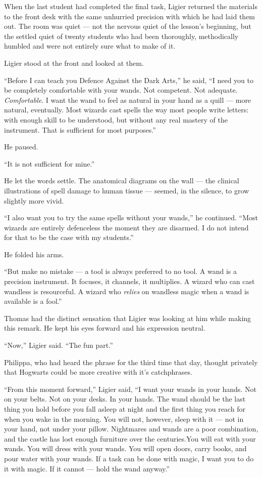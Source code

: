 When the last student had completed the final task, Ligier returned the materials to the front desk with the same unhurried precision with which he had laid them out. The room was quiet --- not the nervous quiet of the lesson's beginning, but the settled quiet of twenty students who had been thoroughly, methodically humbled and were not entirely sure what to make of it.
 
Ligier stood at the front and looked at them.
 
\enquote{Before I can teach you Defence Against the Dark Arts,} he said, \enquote{I need you to be completely comfortable with your wands. Not competent. Not adequate. \textit{Comfortable}. I want the wand to feel as natural in your hand as a quill --- more natural, eventually. Most wizards cast spells the way most people write letters: with enough skill to be understood, but without any real mastery of the instrument. That is sufficient for most purposes.}
 
He paused.
 
\enquote{It is not sufficient for mine.}
 
He let the words settle. The anatomical diagrams on the wall --- the clinical illustrations of spell damage to human tissue --- seemed, in the silence, to grow slightly more vivid.
 
\enquote{I also want you to try the same spells without your wands,} he continued. \enquote{Most wizards are entirely defenceless the moment they are disarmed. I do not intend for that to be the case with my students.}
 
He folded his arms.
 
\enquote{But make no mistake --- a tool is always preferred to no tool. A wand is a precision instrument. It focuses, it channels, it multiplies. A wizard who can cast wandless is resourceful. A wizard who \textit{relies} on wandless magic when a wand is available is a fool.}
 
Thomas had the distinct sensation that Ligier was looking at him while making this remark. He kept his eyes forward and his expression neutral.
 
\enquote{Now,} Ligier said. \enquote{The fun part.}
 
Philippa, who had heard the phrase for the third time that day, thought privately that Hogwarts could be more creative with it's catchphrases.
 
\enquote{From this moment forward,} Ligier said, \enquote{I want your wands in your hands. Not on your belts. Not on your desks. In your hands. The wand should be the last thing you hold before you fall asleep at night and the first thing you reach for when you wake in the morning.  You will not, however, sleep with it --- not in your hand, not under your pillow. Nightmares and wands are a poor combination, and the castle has lost enough furniture over the centuries.You will eat with your wands. You will dress with your wands. You will open doors, carry books, and pour water with your wands. If a task can be done with magic, I want you to do it with magic. If it cannot --- hold the wand anyway.}
 
